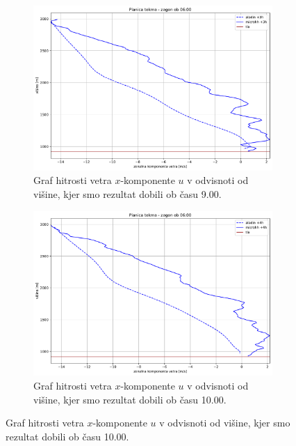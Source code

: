 \documentclass[mat2, tisk]{fmfdelo}
\begin{document}
\begin{figure}[h!]
  \centering
  \begin{subfigure}[b]{1\textwidth}
    \centering
    \includegraphics[width=\textwidth]{rezultati/u_planica_long_3.pdf}
    \caption{Graf hitrosti vetra $x$-komponente $u$ v odvisnoti od višine, kjer smo 
    rezultat dobili ob času 9.00.}
    \label{fig:planica}
  \end{subfigure}\hfill
  \begin{subfigure}[b]{1\textwidth}
    \centering
    \includegraphics[width=\textwidth]{rezultati/u_planica_long_4.pdf} 
    \caption{Graf hitrosti vetra $x$-komponente $u$ v odvisnoti od višine, kjer smo 
    rezultat dobili ob času 10.00.}
    \label{fig:barje}
  \end{subfigure}
  \label{fig:orography_sidebyside}
\end{figure}
\end{document}
